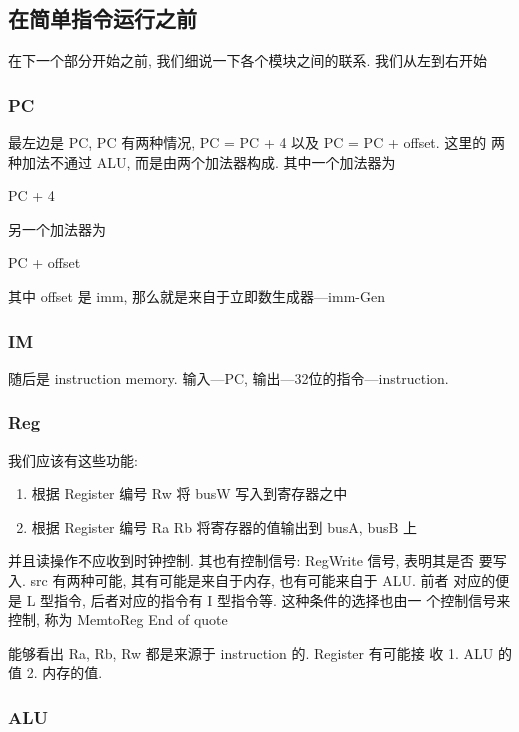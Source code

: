 \documentclass[11pt]{ctexart}
\begin{document}
\subsection{在简单指令运行之前}
\label{sec:org0faab94}

在下一个部分开始之前, 我们细说一下各个模块之间的联系. 我们从左到右开始
\subsubsection{PC}
\label{sec:orgd40ef17}

最左边是 PC, PC 有两种情况, PC = PC + 4 以及 PC = PC + offset. 这里的
两种加法不通过 ALU, 而是由两个加法器构成. 其中一个加法器为

PC + 4 

另一个加法器为 

PC + offset

其中 offset 是 imm, 那么就是来自于立即数生成器---imm-Gen 
\subsubsection{IM}
\label{sec:orgbb321d6}

随后是 instruction memory. 输入---PC, 输出---32位的指令---instruction. 

\subsubsection{Reg}
\label{sec:org9aa2fb0}


我们应该有这些功能:
\begin{enumerate}
\item 根据 Register 编号 Rw 将 busW 写入到寄存器之中
\item 根据 Register 编号 Ra Rb 将寄存器的值输出到 busA, busB 上
\end{enumerate}

并且读操作不应收到时钟控制. 其也有控制信号: RegWrite 信号, 表明其是否
要写入. src 有两种可能, 其有可能是来自于内存, 也有可能来自于 ALU. 前者
对应的便是 L 型指令, 后者对应的指令有 I 型指令等. 这种条件的选择也由一
个控制信号来控制, 称为 MemtoReg 
End of quote

能够看出 Ra, Rb, Rw 都是来源于 instruction 的. Register 有可能接
收 1. ALU 的值 2. 内存的值. 

\subsubsection{ALU}
\label{sec:org912a599}
\end{document}
